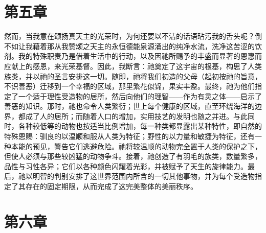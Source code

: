 
\section{第五章 }

然而，当我意在颂扬真天主的光荣时，为何还要以不洁的话语玷污我的舌头呢？倒不如让我藉着那从我赞颂之天主的永恒德能泉源涌出的纯净水流，洗净这苦涩的饮剂。我的特殊职责乃是借着生活中的行动，以及因祂所赐予的丰盛而显著的恩惠而应献上的感恩，来光荣基督。因此，我断言：祂奠定了这宇宙的根基，构思了人类族类，并以祂的圣言安排这一切。随即，祂将我们初造的父母（起初按祂的旨意，不识善恶）迁移到一个幸福的区域，那里繁花似锦，果实丰盈。最终，祂为他们指定了一个适于理性受造物的居所，然后向他们的理智——作为有灵之体——启示了善恶的知识。那时，祂也命令人类繁衍；世上每个健康的区域，直至环绕海洋的边界，都成了人的居所；而随着人口的增加，实用技艺的发明也随之并进。与此同时，各种较低等的动物也按适当比例增加，每一种类都显露出某种特性，即自然的特殊恩赐：驯良的以温顺和服从人类为特征；野性的以力量和敏捷为特征，还有一种本能的预见，警告它们逃避危险。祂将较温顺的动物完全置于人类的保护之下，但使人必须与那些较凶猛的动物争斗。接着，祂创造了有羽毛的族类，数量繁多，品性与习性各异；它们以各种颜色闪耀着光彩，并被赋予了天生的旋律能力。最后，祂以明智的判别安排了这世界范围内所含的一切其他事物，并为每个受造物指定了其存在的固定期限，从而完成了这完美整体的美丽秩序。\par


\section{第六章　 }

